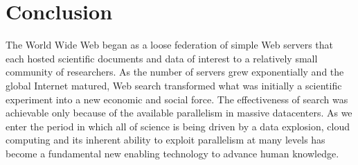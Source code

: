 \documentclass[twocolumn]{article}
\begin{document}
\section{Conclusion}
The World Wide Web began as a loose federation of simple Web servers that each hosted scientific documents and data of interest to a relatively small community of researchers. As the number of servers grew exponentially and the global Internet matured, Web search transformed what was initially a scientific experiment into a new economic and social force. The effectiveness of search was achievable only because of the available parallelism in massive datacenters. As we enter the period in which all of science is being driven by a data explosion, cloud computing and its inherent ability to exploit parallelism at many levels has become a fundamental new enabling technology to advance human knowledge.



\end{document}
